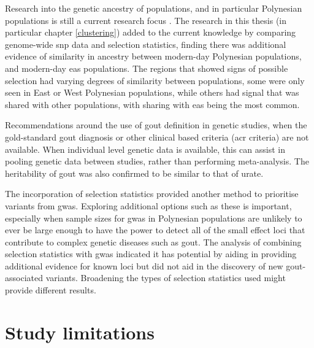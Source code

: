 \documentclass[twoside,openright]{report}
\begin{document}
Research into the genetic ancestry of populations, and in particular
Polynesian populations is still a current research focus
\citep{Hudjashov2018, Matisoo-Smith2018}. The research in this thesis
(in particular chapter \ref{clustering}) added to the current knowledge
by comparing genome-wide \gls{snp} data and selection statistics,
finding there was additional evidence of similarity in ancestry between
modern-day Polynesian populations, and modern-day \gls{eas} populations.
The regions that showed signs of possible selection had varying degrees
of similarity between populations, some were only seen in East or West
Polynesian populations, while others had signal that was shared with
other populations, with sharing with \gls{eas} being the most common.

Recommendations around the use of gout definition in genetic studies,
when the gold-standard gout diagnosis or other clinical based criteria
(\gls{acr} criteria) are not available. When individual level genetic
data is available, this can assist in pooling genetic data between
studies, rather than performing meta-analysis. The heritability of gout
was also confirmed to be similar to that of urate.

The incorporation of selection statistics provided another method to
prioritise variants from \gls{gwas}. Exploring additional options such
as these is important, especially when sample sizes for \gls{gwas} in
Polynesian populations are unlikely to ever be large enough to have the
power to detect all of the small effect loci that contribute to complex
genetic diseases such as gout. The analysis of combining selection
statistics with \gls{gwas} indicated it has potential by aiding in
providing additional evidence for known loci but did not aid in the
discovery of new gout-associated variants. Broadening the types of
selection statistics used might provide different results.

\section{Study limitations}\label{study-limitations}
\end{document}
